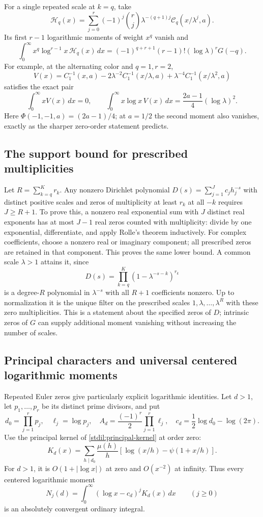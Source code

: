 For a single repeated scale at $k=q$, take
\[
 \mathcal H_q(x)=\sum_{j=0}^r(-1)^j\binom rj
                 \lambda^{-(q+1)j}\mathcal C_q(x/\lambda^j,a).
\]
Its first $r-1$ logarithmic moments of weight $x^q$ vanish and
\[
 \int_0^\infty x^q\log^{r-1}x\,\mathcal H_q(x)\,dx
   =(-1)^{q+r+1}(r-1)!(\log\lambda)^rG(-q).
\]
For example, at the alternating color and $q=1,r=2$,
\[
 V(x)=C_1^{-1}(x,a)-2\lambda^{-2}C_1^{-1}(x/\lambda,a)
                              +\lambda^{-4}C_1^{-1}(x/\lambda^2,a)
\]
satisfies the exact pair
\begin{equation}\label{stconf:colored-bulk}
 \int_0^\infty xV(x)\,dx=0,\qquad
 \int_0^\infty x\log x\,V(x)\,dx
                     =\frac{2a-1}{4}(\log\lambda)^2.
\end{equation}
Here $\Phi(-1,-1,a)=(2a-1)/4$; at $a=1/2$ the second moment
also vanishes, exactly as the sharper zero-order statement predicts.

\subsection{The support bound for prescribed multiplicities}

Let $R=\sum_{k=q}^Kr_k$. Any nonzero Dirichlet polynomial
$D(s)=\sum_{j=1}^Jc_jh_j^{-s}$ with distinct positive scales and
zeros of multiplicity at least $r_k$ at all $-k$ requires
$J\ge R+1$. To prove this, a nonzero real exponential sum with $J$
distinct real exponents has at most $J-1$ real zeros counted with
multiplicity: divide by one exponential, differentiate, and apply
Rolle's theorem inductively. For complex coefficients, choose a nonzero
real or imaginary component; all prescribed zeros are retained in
that component. This proves the same lower bound. A common scale
$\lambda>1$ attains it, since
\[
 D(s)=\prod_{k=q}^K(1-\lambda^{-s-k})^{r_k}
\]
is a degree-$R$ polynomial in $\lambda^{-s}$ with all $R+1$
coefficients nonzero. Up to normalization it is the unique filter on
the prescribed scales $1,\lambda,\ldots,\lambda^R$ with these zero
multiplicities. This is a statement about the specified zeros of $D$;
intrinsic zeros of $G$ can supply additional moment vanishing without
increasing the number of scales.

\subsection{Principal characters and universal centered logarithmic moments}
\label{stlog:principal}

Repeated Euler zeros give particularly explicit logarithmic identities.
Let $d>1$, let $p_1,\ldots,p_r$ be its distinct prime divisors, and put
\[
 d_0=\prod_{j=1}^rp_j,\quad \ell_j=\log p_j,\quad
 A_d=\frac{(-1)^r}{2}\prod_{j=1}^r\ell_j,\quad
 c_d=\frac12\log d_0-\log(2\pi).
\]
Use the principal kernel of \eqref{stdil:principal-kernel} at order zero:
\[
 K_d(x)=\sum_{h\mid d_0}\frac{\mu(h)}h
             [\log(x/h)-\psi(1+x/h)].
\]
For $d>1$, it is $O(1+|\log x|)$ at zero and $O(x^{-2})$ at infinity.
Thus every centered logarithmic moment
\[
 N_j(d)=\int_0^\infty (\log x-c_d)^jK_d(x)\,dx
 \qquad(j\ge0)
\]
is an absolutely convergent ordinary integral.

